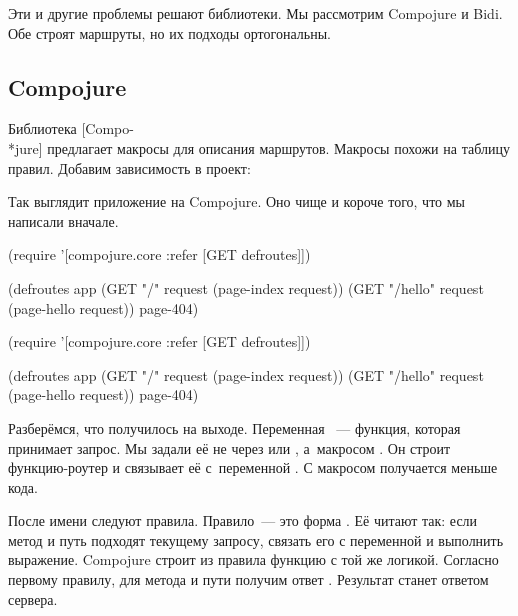 Эти и другие проблемы решают библиотеки. Мы рассмотрим Compojure и Bidi. Обе
строят маршруты, но их подходы ортогональны.

\subsection{Compojure}

\label{compojure}


Библиотека [Compo-\\*jure]
предлагает макросы для описания маршрутов. Макросы похожи на таблицу правил.
Добавим зависимость в проект:

\begin{clojure}
[compojure "1.6.1"]
\end{clojure}

Так выглядит приложение на Compojure. Оно чище и короче того, что мы написали
вначале.

\ifnarrow

\begin{clojure}
(require '[compojure.core
           :refer [GET defroutes]])

(defroutes app
  (GET "/" request
    (page-index request))
  (GET "/hello" request
    (page-hello request))
  page-404)
\end{clojure}

\else

\begin{clojure}
(require '[compojure.core :refer [GET defroutes]])

(defroutes app
  (GET "/"      request (page-index request))
  (GET "/hello" request (page-hello request))
  page-404)
\end{clojure}

\fi

Разберёмся, что получилось на выходе. Переменная ~--- функция, которая
принимает запрос. Мы задали её не через  или , а~макросом
. Он строит функцию-роутер и связывает её с~переменной
. С макросом получается меньше кода.

После имени следуют правила. Правило~--- это форма . Её читают так: если метод и путь подходят текущему
запросу, связать его с переменной и выполнить выражение. Compojure строит из
правила функцию с той же логикой. Согласно первому правилу, для метода и пути
 получим ответ . Результат станет ответом
сервера.

